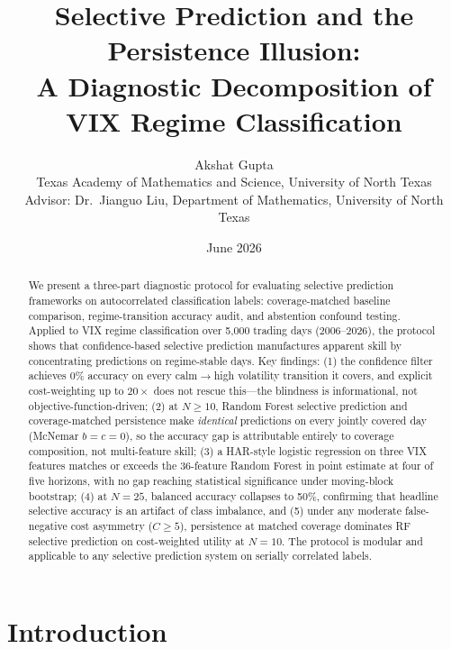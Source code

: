 \documentclass[12pt]{article}
\title{\textbf{Selective Prediction and the Persistence Illusion:\\
A Diagnostic Decomposition of VIX Regime Classification}}
\author{
    Akshat Gupta \\
    \small Texas Academy of Mathematics and Science, University of North Texas \\
    \small Advisor: Dr.\ Jianguo Liu, Department of Mathematics, University of North Texas
}
\date{June 2026}
\begin{document}
\maketitle

\begin{abstract}
We present a three-part diagnostic protocol for evaluating selective prediction frameworks on autocorrelated classification labels: coverage-matched baseline comparison, regime-transition accuracy audit, and abstention confound testing. Applied to VIX regime classification over 5,000 trading days (2006--2026), the protocol shows that confidence-based selective prediction manufactures apparent skill by concentrating predictions on regime-stable days. Key findings: (1) the confidence filter achieves 0\% accuracy on every calm$\to$high volatility transition it covers, and explicit cost-weighting up to $20{\times}$ does not rescue this---the blindness is informational, not objective-function-driven; (2) at $N \geq 10$, Random Forest selective prediction and coverage-matched persistence make \emph{identical} predictions on every jointly covered day (McNemar $b = c = 0$), so the accuracy gap is attributable entirely to coverage composition, not multi-feature skill; (3) a HAR-style logistic regression on three VIX features matches or exceeds the 36-feature Random Forest in point estimate at four of five horizons, with no gap reaching statistical significance under moving-block bootstrap; (4) at $N = 25$, balanced accuracy collapses to 50\%, confirming that headline selective accuracy is an artifact of class imbalance, and (5) under any moderate false-negative cost asymmetry ($C \geq 5$), persistence at matched coverage dominates RF selective prediction on cost-weighted utility at $N = 10$. The protocol is modular and applicable to any selective prediction system on serially correlated labels.
\end{abstract}

\tableofcontents
\newpage

\section{Introduction}
\end{document}
